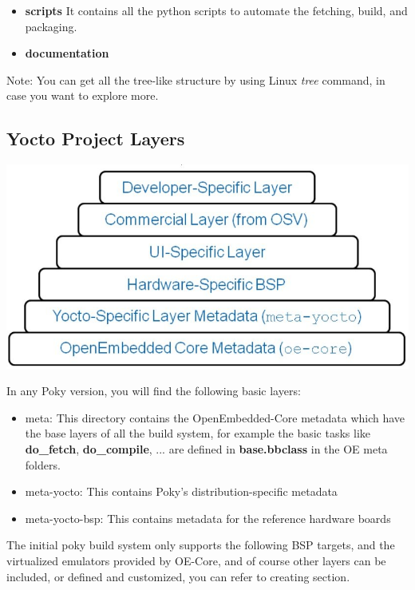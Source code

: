 \documentclass{article}
\begin{document}
\begin{itemize}
  \item \textbf{scripts}
  It contains all the python scripts to automate the fetching, build, and packaging. 
  \item \textbf{documentation}
\end{itemize}

Note: You can get all the tree-like structure by using Linux \textit{tree} command, in case you want to explore more.

\subsection{Yocto Project Layers}
\label{yocto-layers}
\begin{center}
  \includegraphics[scale=0.40]{./resources/img/Yocto-Layers.jpeg}
\end{center}

In any Poky version, you will find the following basic layers:
\begin{itemize}
    \item meta: This directory contains the OpenEmbedded-Core metadata which have the base layers of all the build system, for example the basic tasks like \textbf{do\_fetch}, \textbf{do\_compile}, ... are defined in \textbf{base.bbclass} in the OE meta folders.
    \item meta-yocto: This contains Poky's distribution-specific metadata
    \item meta-yocto-bsp: This contains metadata for the reference hardware boards
\end{itemize}

The initial poky build system only supports the following BSP targets, and the virtualized emulators provided by OE-Core, and of course other layers can be included, or defined and customized, you can refer to creating  section.
\end{document}
